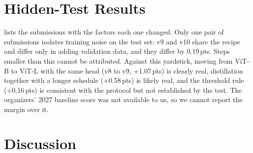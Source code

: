 \documentclass[10pt,twocolumn,letterpaper]{article}
\newcommand{\pts}{\,pts}
\begin{document}
\section{Hidden-Test Results}
\label{sec:test}

 lists the submissions with the factors each one changed. Only one pair of submissions isolates training noise on the test set: v9 and v10 share the recipe and differ only in adding validation data, and they differ by 0.19\pts. Steps smaller than this cannot be attributed. Against this yardstick, moving from ViT-B to ViT-L with the same head (v8 to v9, +1.07\pts) is clearly real, distillation together with a longer schedule (+0.58\pts) is likely real, and the threshold rule (+0.16\pts) is consistent with the protocol but not established by the test. The organizers' 2027 baseline score was not available to us, so we cannot report the margin over it.

\begin{table}[t]
\centering\small
\setlength{\tabcolsep}{3pt}
\caption{Hidden-test submissions (values $\times100$). LODO is the PETA-held-out score of the same recipe and rule; LODO values for v4b--v9 come from the earlier batch; $^\dagger$10-epoch proxy of a 20-epoch recipe. The v9/v10 difference (0.19\pts) is the only test-set replicate.}
\label{tab:main}
\end{table}

\section{Discussion}
\end{document}
